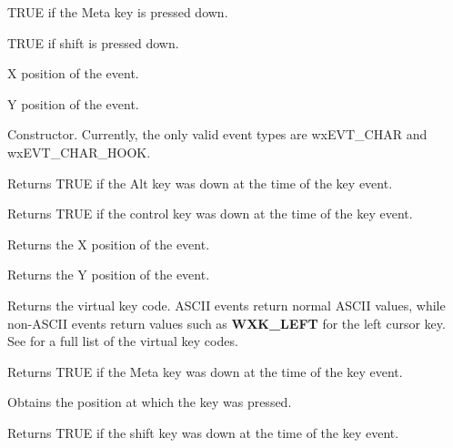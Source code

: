 TRUE if the Meta key is pressed down.



TRUE if shift is pressed down.



X position of the event.



Y position of the event.



Constructor. Currently, the only valid event types are wxEVT\_CHAR and wxEVT\_CHAR\_HOOK.



Returns TRUE if the Alt key was down at the time of the key event.



Returns TRUE if the control key was down at the time of the key event.



Returns the X position of the event.



Returns the Y position of the event.



Returns the virtual key code. ASCII events return normal ASCII values,
while non-ASCII events return values such as {\bf WXK\_LEFT} for the
left cursor key. See  for a full list of the virtual key codes.



Returns TRUE if the Meta key was down at the time of the key event.



Obtains the position at which the key was pressed.



Returns TRUE if the shift key was down at the time of the key event.


